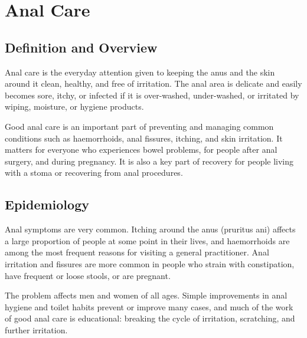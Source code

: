\chapter{Anal Care}

\section*{Definition and Overview}
Anal care is the everyday attention given to keeping the anus and the skin around it clean, healthy, and free of irritation. The anal area is delicate and easily becomes sore, itchy, or infected if it is over-washed, under-washed, or irritated by wiping, moisture, or hygiene products.

Good anal care is an important part of preventing and managing common conditions such as haemorrhoids, anal fissures, itching, and skin irritation. It matters for everyone who experiences bowel problems, for people after anal surgery, and during pregnancy. It is also a key part of recovery for people living with a stoma or recovering from anal procedures.

\section*{Epidemiology}
Anal symptoms are very common. Itching around the anus (pruritus ani) affects a large proportion of people at some point in their lives, and haemorrhoids are among the most frequent reasons for visiting a general practitioner. Anal irritation and fissures are more common in people who strain with constipation, have frequent or loose stools, or are pregnant.

The problem affects men and women of all ages. Simple improvements in anal hygiene and toilet habits prevent or improve many cases, and much of the work of good anal care is educational: breaking the cycle of irritation, scratching, and further irritation.

